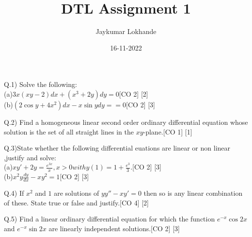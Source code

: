\documentclass[12pt]{article}
\title{DTL Assignment 1}
\author{Jaykumar Lokhande}
\date{16-11-2022}
\begin{document}
\maketitle
\newpage
{}
\begin{flushleft}
Q.1) Solve the following:\\[10pt]
(a)$3x(xy-2)dx+(x^3+2y)dy=0$\hspace{5cm}[CO 2] [2]\\[6 pt]
(b)$(2\cos{y} + 4x^2)dx -x\sin{y}dy==0$\hspace{4.65cm}[CO 2]    [3]\\
\end{flushleft} 



\begin{flushleft}
 Q.2) Find a homogeneous linear second order ordinary differential equation whose solution is the set of all straight lines in the $xy$-plane.\hspace{1cm}[CO 1] [1]\\ 
\end{flushleft}

\begin{flushleft}
 Q.3)State whether the following differential euations are linear or non linear ,justify and solve:\\[10pt]
(a)$xy'+2y = \frac{e^{3x}}{x}, x>0 with y(1)=1+\frac{e^3}{3}. $\hspace{3.5cm}[CO 2] [3]\\[6 pt]
(b)$x^2y\frac{dy}{dx}- xy^2 = 1$\hspace{7.05cm}[CO 2] [3]
\end{flushleft}

\begin{flushleft}
Q.4) If $x^2$ and $1$ are solutions of $yy''-xy'=0$ then so is any linear combination of these. State true or false and justify.\hspace{2cm}[CO 4] [2]
\end{flushleft}

\begin{flushleft}
Q.5) Find a linear ordinary differential equation for which the function $e^{-x}\cos{2x}$ and $e^{-x}\sin{2x}$ are linearly independent solutions.\hspace{0.7cm}[CO 2] [3]
\end{flushleft}

\begin{flushleft}

\end{flushleft}
\end{document}
